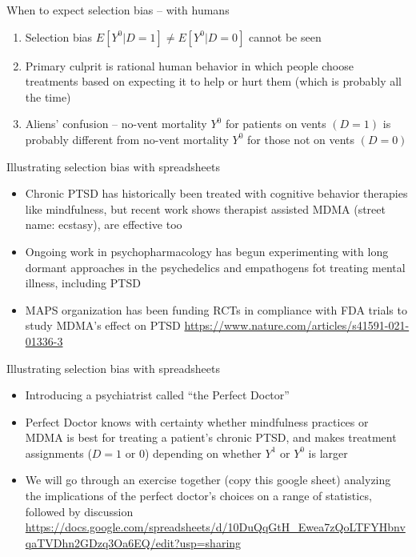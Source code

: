 \documentclass{beamer}
\begin{document}
\begin{frame}{When to expect selection bias -- with humans}

  \bigskip
  \begin{enumerate}
    \item Selection bias $E[Y^0|D=1] \neq E[Y^0|D=0]$ cannot be seen
    \item Primary culprit is rational human behavior in which people choose treatments based on expecting it to help or hurt them (which is probably all the time)
    \item Aliens' confusion -- no-vent mortality $Y^0$ for patients on vents $(D=1)$ is probably different from no-vent mortality $Y^0$ for those not on vents $(D=0)$
  \end{enumerate}

\end{frame}


\begin{frame}{Illustrating selection bias with spreadsheets}

  \begin{itemize}
    \item Chronic PTSD has historically been treated with cognitive behavior therapies like mindfulness, but recent work shows therapist assisted MDMA (street name: ecstasy), are effective too
    \item Ongoing work in psychopharmacology has begun experimenting with long dormant approaches in the psychedelics and empathogens fot treating mental illness, including PTSD
    \item MAPS organization has been funding RCTs in compliance with FDA trials to study MDMA's effect on PTSD \url{https://www.nature.com/articles/s41591-021-01336-3}
    \end{itemize}
    
\end{frame}


\begin{frame}{Illustrating selection bias with spreadsheets}
\begin{itemize}
\item Introducing a psychiatrist called ``the Perfect Doctor''
\item Perfect Doctor knows with certainty whether mindfulness practices or MDMA is best for treating a patient's chronic PTSD, and makes treatment assignments ($D=1$ or $0$) depending on whether $Y^1$ or $Y^0$ is larger
\item We will go through an exercise together (copy this google sheet) analyzing the implications of the perfect doctor's choices on a range of statistics, followed by discussion \url{https://docs.google.com/spreadsheets/d/10DuQqGtH_Ewea7zQoLTFYHbnvqaTVDhn2GDzq3Oa6EQ/edit?usp=sharing}
\end{itemize}
\end{frame}
\end{document}
